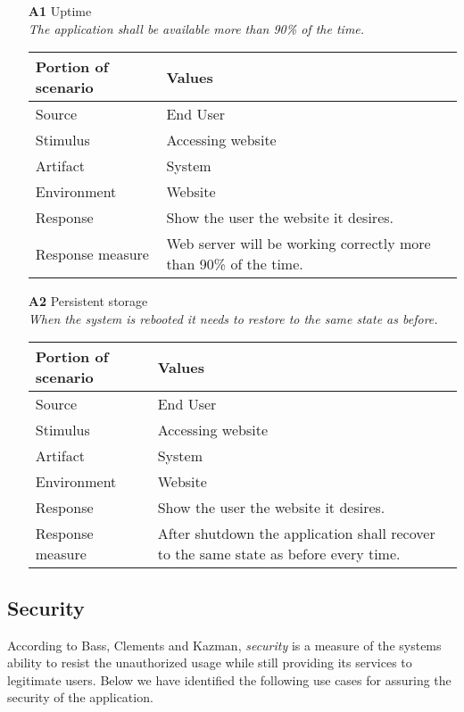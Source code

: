 \begin{itemize}
    \item[\textbf{A1}] Uptime \\
    \textit{\small{The application shall be available more than 90\% of the time.}}
        
    \begin{tabular}{| l | p{7cm} |}
        \hline
        \rowcolor[gray]{0.8}
        \textbf{Portion of scenario} & \textbf{Values} \\
        \hline
        Source & End User \\
        Stimulus & Accessing website \\
        Artifact & System \\
        Environment & Website \\
        Response & Show the user the website it desires. \\
        Response measure & Web server will be working correctly more than 90\% of the time. \\
        \hline
    \end{tabular}

    \item[\textbf{A2}] Persistent storage \\
    \textit{\small{When the system is rebooted it needs to restore to the same state as before.}}
        
    \begin{tabular}{| l | p{7cm} |}
        \hline
        \rowcolor[gray]{0.8}
        \textbf{Portion of scenario} & \textbf{Values} \\
        \hline
        Source & End User \\
        Stimulus & Accessing website \\
        Artifact & System \\
        Environment & Website \\
        Response & Show the user the website it desires. \\
        Response measure & After shutdown the application shall recover to the same state as before every time. \\
        \hline
    \end{tabular}
\end{itemize}

\subsection{Security}
According to Bass, Clements and Kazman, \emph{security} is a measure of the systems ability to resist the unauthorized usage while still providing its services to legitimate users\cite{ProgarkPensum}. Below we have identified the following use cases for assuring the security of the application.

